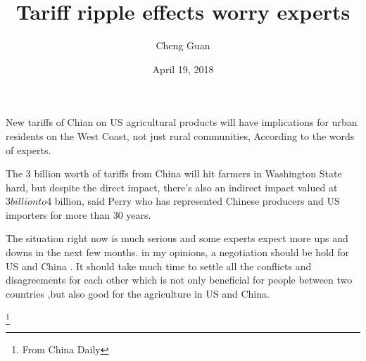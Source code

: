 \documentclass[UTF8]{article}
\author{Cheng Guan}
\date{April 19, 2018}
\title{Tariff ripple effects worry experts}
\begin{document}
\maketitle

     New tariffs of Chian on US agricultural products will have
   implications for urban residents on the West Coast,
   not just rural communities, According to the words of experts.

     The 3 billion worth of tariffs from China will hit farmers in Washington State hard,
   but despite the direct impact, there’s also an indirect impact valued at $3 billion to $4 billion,
   said Perry who has represented Chinese producers and US importers for more than 30 years.

      The situation right now is much serious and some experts expect more ups and downs in the next few months.
    in my opinions, a negotiation should be hold for US and China . It should take much time
    to settle all the conflicts and disagreements for each other which is not only beneficial for
    people between two countries ,but also good for the agriculture in US and China.


   \footnote{\centering From China Daily}
 
\end{document}
